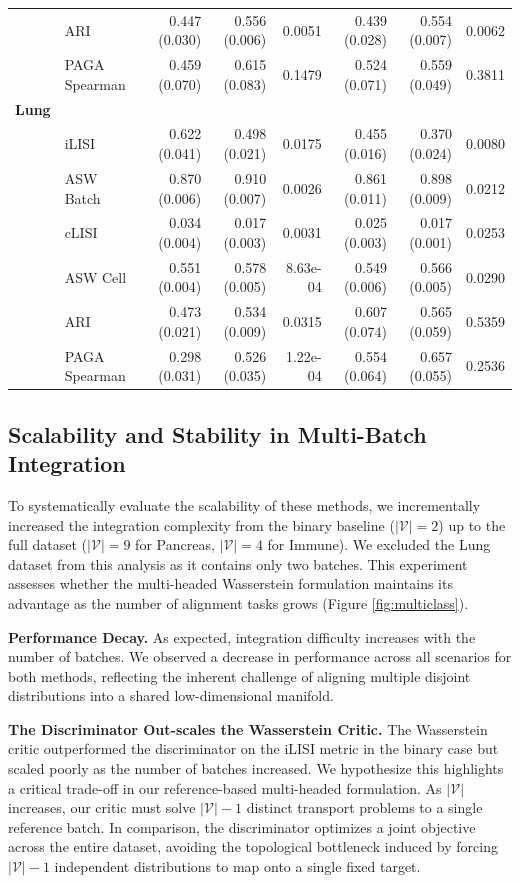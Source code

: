 \documentclass[unnumsec,webpdf,contemporary,large]{oup-authoring-template}%
\theoremstyle{thmstyleone}%
\theoremstyle{thmstyletwo}%
\theoremstyle{thmstylethree}%
\begin{document}
\begin{table}[t!]
\begin{tabular*}{\textwidth}{@{\extracolsep{\fill}} l l r r r r r r }
 & ARI & 0.447 (0.030) & 0.556 (0.006) & 0.0051 & 0.439 (0.028) & 0.554 (0.007) & 0.0062 \\
 & PAGA Spearman & 0.459 (0.070) & 0.615 (0.083) & 0.1479 & 0.524 (0.071) & 0.559 (0.049) & 0.3811 \\
\addlinespace
\textbf{Lung} & & & & & & & \\
 & iLISI & 0.622 (0.041) & 0.498 (0.021) & 0.0175 & 0.455 (0.016) & 0.370 (0.024) & 0.0080 \\
 & ASW Batch & 0.870 (0.006) & 0.910 (0.007) & 0.0026 & 0.861 (0.011) & 0.898 (0.009) & 0.0212 \\
 & cLISI & 0.034 (0.004) & 0.017 (0.003) & 0.0031 & 0.025 (0.003) & 0.017 (0.001) & 0.0253 \\
 & ASW Cell & 0.551 (0.004) & 0.578 (0.005) & 8.63e-04 & 0.549 (0.006) & 0.566 (0.005) & 0.0290 \\
 & ARI & 0.473 (0.021) & 0.534 (0.009) & 0.0315 & 0.607 (0.074) & 0.565 (0.059) & 0.5359 \\
 & PAGA Spearman & 0.298 (0.031) & 0.526 (0.035) & 1.22e-04 & 0.554 (0.064) & 0.657 (0.055) & 0.2536 \\
\bottomrule
\end{tabular*}
\end{table}

\subsection{Scalability and Stability in Multi-Batch Integration}
To systematically evaluate the scalability of these methods, we incrementally increased the integration complexity from the binary baseline ($\lvert\mathcal{V}\rvert=2$) up to the full dataset ($\lvert\mathcal{V}\rvert=9$ for Pancreas, $\lvert\mathcal{V}\rvert=4$ for Immune). We excluded the Lung dataset from this analysis as it contains only two batches. This experiment assesses whether the multi-headed Wasserstein formulation maintains its advantage as the number of alignment tasks grows (Figure \ref{fig:multiclass}).

\textbf{Performance Decay.} As expected, integration difficulty increases with the number of batches. We observed a decrease in performance across all scenarios for both methods, reflecting the inherent challenge of aligning multiple disjoint distributions into a shared low-dimensional manifold.

\textbf{The Discriminator Out-scales the Wasserstein Critic.} The Wasserstein critic outperformed the discriminator on the iLISI metric in the binary case but scaled poorly as the number of batches increased. We hypothesize this highlights a critical trade-off in our reference-based multi-headed formulation. As $\lvert\mathcal{V}\rvert$ increases, our critic must solve $\lvert\mathcal{V}\rvert-1$ distinct transport problems to a single reference batch. In comparison, the discriminator optimizes a joint objective across the entire dataset, avoiding the topological bottleneck induced by forcing $\lvert\mathcal{V}\rvert-1$ independent distributions to map onto a single fixed target.
\end{document}
